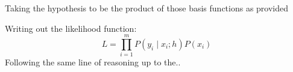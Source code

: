 \documentclass[12pt]{article}
\newenvironment{problem}[2][Problem]{\begin{trivlist}
\item[\hskip \labelsep {\bfseries #1}\hskip \labelsep {\bfseries #2.}]}{\end{trivlist}}
\begin{document}
\begin{problem}{3. (a)}

\end{problem}

\begin{problem}{3. (b)}
\end{problem}

\begin{problem}{3. (c)}
\end{problem}

\begin{problem}{4.}
Taking the hypothesis to be the product of those basis functions as provided
\end{problem}
Writing out the likelihood function:
\[
    L = \prod_{i=1}^{m} P(y_i \mid x_i ; h ) P(x_i)
\]
Following the same line of reasoning up to the..


\end{document}
